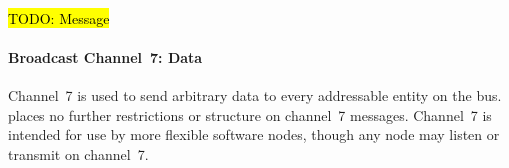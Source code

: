 ~

\hl{TODO: Message}


\paragraph{Broadcast Channel~7: Data}
\label{sec:channel-7}
Channel~7 is used to send arbitrary data to every addressable entity on the
bus. \bus places no further restrictions or structure on channel~7 messages.
Channel~7 is intended for use by more flexible software nodes, though any node
may listen or transmit on channel~7.
